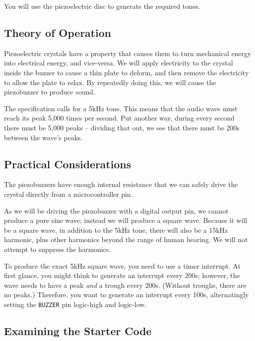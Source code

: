 You will use the piezoelectric disc to generate the required tones.

\subsection{Theory of Operation}

Piezoelectric crystals have a property that causes them to turn mechanical energy into electrical energy, and vice-versa.
We will apply electricity to the crystal inside the buzzer to cause a thin plate to deform, and then remove the electricity to allow the plate to relax.
By repeatedly doing this, we will cause the piezobuzzer to produce sound.

The specification calls for a 5kHz tone.
This means that the audio wave must reach its peak 5,000 times per second.
Put another way, during every second there must be 5,000 peaks -- dividing that out, we see that there must be 200\textmu s between the wave's peaks.

\subsection{Practical Considerations}

The piezobuzzers have enough internal resistance that we can safely drive the crystal directly from a microcontroller pin.

As we will be driving the piezobuzzer with a digital output pin, we cannot produce a pure sine wave;
instead we will produce a square wave.
Because it will be a square wave, in addition to the 5kHz tone, there will also be a 15kHz harmonic, plus other harmonics beyond the range of human hearing.
We will not attempt to suppress the harmonics.

To produce the exact 5kHz square wave, you need to use a timer interrupt.
At first glance, you might think to generate an interrupt every 200\textmu s;
however, the wave needs to have a peak \textit{and} a trough every 200\textmu s.
(Without troughs, there are no peaks.)
Therefore, you want to generate an interrupt every 100\textmu s, alternatingly setting the \lstinline{BUZZER} pin logic-high and logic-low.

\subsection{Examining the Starter Code}

